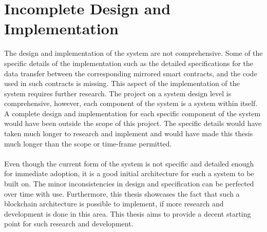 \documentclass[a4paper,twoside,phd]{BYUPhys}
\begin{document}
\section{Incomplete Design and Implementation}
The design and implementation of the system are not comprehensive. Some of the specific details of the implementation such as the detailed specifications for the data transfer between the corresponding mirrored smart contracts, and the code used in such contracts is missing. This aspect of the implementation of the system requires further research. The project on a system design level is comprehensive, however, each component of the system is a system within itself. A complete design and implementation for each specific component of the system would have been outside the scope of this project. The specific details would have taken much longer to research and implement and would have made this thesis much longer than the scope or time-frame permitted.
\\
\\
Even though the current form of the system is not specific and detailed enough for immediate adoption, it is a good initial architecture for such a system to be built on. The minor inconsistencies in design and specification can be perfected over time with use. Furthermore, this thesis showcases the fact that such a blockchain architecture is possible to implement, if more research and development is done in this area. This thesis aims to provide a decent starting point for such research and development.
\end{document}
